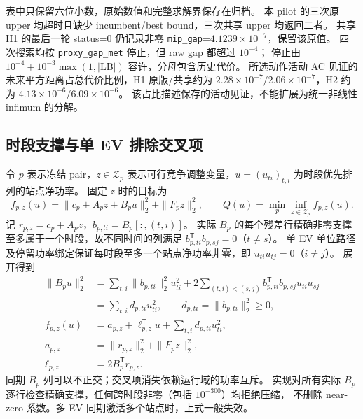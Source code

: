 表中只保留六位小数，原始数值和完整求解界保存在归档。
本 pilot 的三次原 upper 均超时且缺少 incumbent/best bound，三次共享 upper 均返回二者。
共享 H1 的最后一轮 status=0 仍记录非零 \texttt{mip\_gap}=$4.1239\times10^{-7}$，保留该原值。
四次搜索均按 \texttt{proxy\_gap\_met} 停止，但 raw gap 都超过 $10^{-4}$；
停止由 $10^{-4}+10^{-3}\max(1,|\mathrm{LB}|)$ 容许，分母包含历史代价。
所选动作活动 AC 见证的未来平方距离占总代价比例，H1 原版/共享约为
$2.28\times10^{-7}/2.06\times10^{-7}$，H2 约为 $4.13\times10^{-6}/6.09\times10^{-6}$。
该占比描述保存的活动见证，不能扩展为统一非线性 infimum 的分解。

\subsection{时段支撑与单 EV 排除交叉项}
令 $p$ 表示冻结 pair，$z\in\mathcal Z_p$ 表示可行竞争调整变量，$u=(u_{ti})_{t,i}$ 为时段优先排列的站点净功率。
固定 $z$ 时的目标为
\begin{equation}
 f_{p,z}(u)=\|c_p+A_pz+B_pu\|_2^2+\|F_pz\|_2^2,
 \qquad Q(u)=\min_p\inf_{z\in\mathcal Z_p}f_{p,z}(u).
\end{equation}
记 $r_{p,z}=c_p+A_pz$，$b_{p,ti}=B_p[:,(t,i)]$。
实际 $B_p$ 的每个残差行精确非零支撑至多属于一个时段，故不同时间的列满足
$b_{p,ti}^{\mathsf T}b_{p,sj}=0$（$t\ne s$）。
单 EV 单位路径及停留功率绑定保证每时段至多一个站点净功率非零，即
$u_{ti}u_{tj}=0$（$i\ne j$）。
展开得到
\begin{align}
 \|B_pu\|_2^2
 &=\sum_{t,i}\|b_{p,ti}\|_2^2u_{ti}^2
   +2\!\sum_{(t,i)<(s,j)}b_{p,ti}^{\mathsf T}b_{p,sj}u_{ti}u_{sj}\\
 &=\sum_{t,i}d_{p,ti}u_{ti}^2,\qquad d_{p,ti}=\|b_{p,ti}\|_2^2\ge0,\\
 f_{p,z}(u)&=a_{p,z}+\ell_{p,z}^{\mathsf T}u+\sum_{t,i}d_{p,ti}u_{ti}^2,\\
 a_{p,z}&=\|r_{p,z}\|_2^2+\|F_pz\|_2^2,\\
 \ell_{p,z}&=2B_p^{\mathsf T}r_{p,z}.
\end{align}
同期 $B_p$ 列可以不正交；交叉项消失依赖运行域的功率互斥。
实现对所有实际 $B_p$ 逐行检查精确支撑，任何跨时段非零（包括 $10^{-300}$）均拒绝压缩，
不删除 near-zero 系数。多 EV 同期激活多个站点时，上式一般失效。

